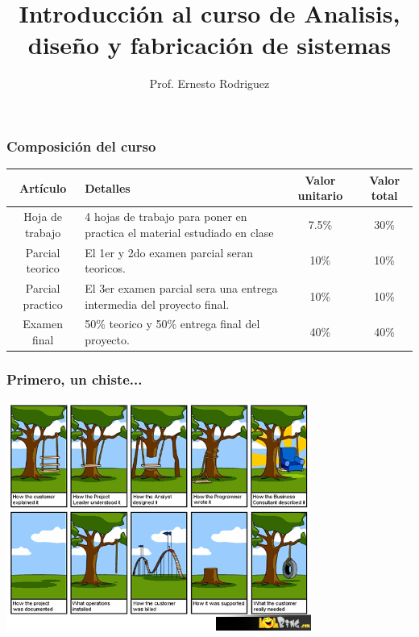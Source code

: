 \documentclass{beamer}
\title[Introducciòn]{Introducci\'on al curso de Analisis, dise\~{n}o y fabricaci\'on de sistemas}
\author{Prof. Ernesto Rodriguez}
\institute{
    Universidad del Itsmo \\
    \medskip \textit{erodriguez@unis.edu.gt}
}
\date[\today]{}
\begin{document}
\begin{frame}
\titlepage
\end{frame}

\begin{frame}
    \frametitle{Composici\'on del curso}
    \begin{tabular}{|c|p{3.8cm}|c|c|}
        \hline
        \bf{Art\'iculo} & \bf{Detalles} & \bf{Valor unitario} & \bf{Valor total} \\
        \hline
        Hoja de trabajo & 4 hojas de trabajo para poner en practica el material estudiado en clase & 7.5\% & 30\% \\
        \hline
        Parcial teorico & El 1er y 2do examen parcial seran teoricos. & 10\% & 10\% \\
        \hline
        Parcial practico & El 3er examen parcial sera una entrega intermedia del proyecto final. & 10\% & 10\% \\
        \hline
        Examen final & 50\% teorico y 50\% entrega final del proyecto. & 40\% & 40\% \\
        \hline
        
    \end{tabular}
\end{frame}

\begin{frame}
\frametitle{Primero, un chiste...}
\begin{center}
\includegraphics[width=10cm]{software-engineering-explained.png}
\end{center}
\end{frame}
\end{document}
